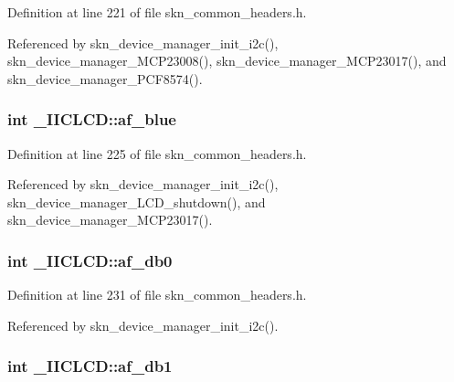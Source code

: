 Definition at line 221 of file skn\+\_\+common\+\_\+headers.\+h.



Referenced by skn\+\_\+device\+\_\+manager\+\_\+init\+\_\+i2c(), skn\+\_\+device\+\_\+manager\+\_\+\+M\+C\+P23008(), skn\+\_\+device\+\_\+manager\+\_\+\+M\+C\+P23017(), and skn\+\_\+device\+\_\+manager\+\_\+\+P\+C\+F8574().

\hypertarget{struct___i_i_c_l_c_d_ad64bc4c5fc6a592f161e594f0b2433e1}{
\subsubsection[{af\+\_\+blue}]{\setlength{\rightskip}{0pt plus 5cm}int \+\_\+\+I\+I\+C\+L\+C\+D\+::af\+\_\+blue}}\label{struct___i_i_c_l_c_d_ad64bc4c5fc6a592f161e594f0b2433e1}


Definition at line 225 of file skn\+\_\+common\+\_\+headers.\+h.



Referenced by skn\+\_\+device\+\_\+manager\+\_\+init\+\_\+i2c(), skn\+\_\+device\+\_\+manager\+\_\+\+L\+C\+D\+\_\+shutdown(), and skn\+\_\+device\+\_\+manager\+\_\+\+M\+C\+P23017().

\hypertarget{struct___i_i_c_l_c_d_a86dfd51ffdc849569bc91bba9f9cd4a6}{
\subsubsection[{af\+\_\+db0}]{\setlength{\rightskip}{0pt plus 5cm}int \+\_\+\+I\+I\+C\+L\+C\+D\+::af\+\_\+db0}}\label{struct___i_i_c_l_c_d_a86dfd51ffdc849569bc91bba9f9cd4a6}


Definition at line 231 of file skn\+\_\+common\+\_\+headers.\+h.



Referenced by skn\+\_\+device\+\_\+manager\+\_\+init\+\_\+i2c().

\hypertarget{struct___i_i_c_l_c_d_a114a5f81c889fe857d714a3a5033b397}{
\subsubsection[{af\+\_\+db1}]{\setlength{\rightskip}{0pt plus 5cm}int \+\_\+\+I\+I\+C\+L\+C\+D\+::af\+\_\+db1}}\label{struct___i_i_c_l_c_d_a114a5f81c889fe857d714a3a5033b397}


